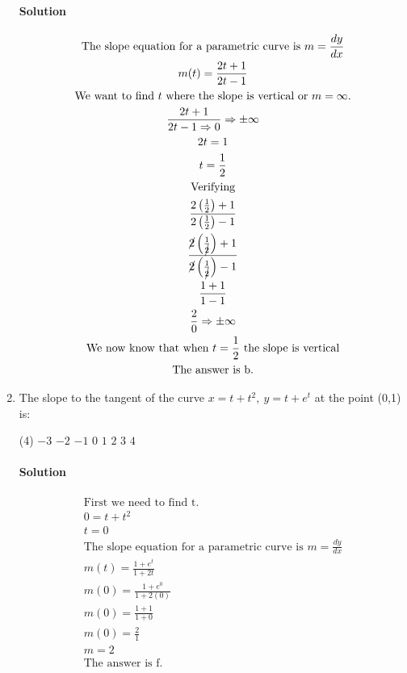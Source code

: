 \documentclass[MATH-115-Notes.tex]{subfiles}
\begin{document}
\begin{enumerate}[itemsep=5mm]
    \paragraph*{Solution}
    \begin{gather*}
        \text{The slope equation for a parametric curve is } m = \frac{dy}{dx}\\
        m(t) = \frac{2t + 1}{2t - 1}\\
        \text{We want to find $t$ where the slope is vertical or $m = \infty$.}\\
        \frac{2t + 1}{2t - 1 \Rightarrow 0} \Rightarrow \pm\infty\\
        2t = 1\\
        t = \frac{1}{2}\\
        \text{Verifying}\\
        \frac{2\left( \frac{1}{2} \right) + 1}{2\left( \frac{1}{2} \right) - 1}\\
        \frac{\cancel{2}\left( \frac{1}{\cancel{2}} \right) + 1}{\cancel{2}\left( \frac{1}{\cancel{2}} \right) - 1}\\
        \frac{1 + 1}{1 - 1}\\
        \frac{2}{0} \Rightarrow \pm\infty\\
        \text{We now know that when $t = \frac{1}{2}$ the slope is vertical}\\
        \text{The answer is b.}
    \end{gather*}
    \newpage
    \item The slope to the tangent of the curve $x = t+ t^2,\ y = t + e^t$ at the point (0,1) is:
    \begin{tasks}(4)
        \task \(-3\)
        \task \(-2\)
        \task \(-1\)
        \task \(0\)
        \task \(1\)
        \task \(2\)
        \task \(3\)
        \task \(4\)
    \end{tasks}
    \paragraph*{Solution}
    \begin{gather*}
        \text{First we need to find t.}\\
        0 = t + t^2\\
        t = 0\\
        \text{The slope equation for a parametric curve is } m = \frac{dy}{dx}\\
        m(t) = \frac{1 + e^t}{1 + 2t}\\
        m(0) = \frac{1+e^0}{1+2(0)}\\
        m(0) = \frac{1 + 1}{1 + 0}\\
        m(0) = \frac{2}{1}\\
        m = 2\\
        \text{The answer is f.}
    \end{gather*}
\end{enumerate}
\newpage
\end{document}

